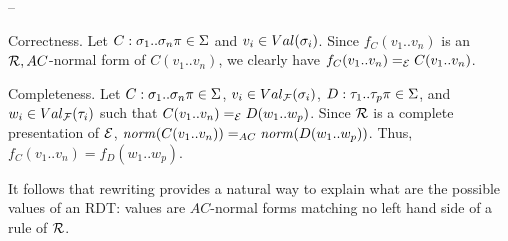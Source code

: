 \begin{prf}
\begin{lst}{--}
\item Correctness. Let $C:\s_1..\s_n\pi\in\S$
and $v_i\in Val(\s_i)$. Since $f_C(v_1..v_n)$ is an $\cR,AC$-normal
form of $C(v_1..v_n)$, we clearly have $f_C(v_1..v_n)=_\cE
C(v_1..v_n)$.

\item Completeness. 
Let $C:\s_1..\s_n\pi\in\S$, $v_i\in Val_\cF(\s_i)$,
$D:\tau_1..\tau_p\pi\in\S$, and $w_i\in Val_\cF(\tau_i)$ such that
$C(v_1..v_n)=_\cE D(w_1..w_p)$. Since $\cR$ is a complete presentation
of $\cE$, $\norm(C(v_1..v_n))=_{AC}\norm(D(w_1..w_p))$. Thus,
$f_C(v_1..v_n)= f_D(w_1..w_p)$.\cqfd\\
\end{lst}
\end{prf}

It follows that rewriting provides a natural way to explain what are
the possible values of an RDT: values are $AC$-normal forms matching
no left hand side of a rule of $\cR$.
